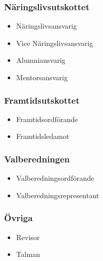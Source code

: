 \documentclass{dsekkallelse}
\begin{document}
\begin{multicols}{2}
  \subsubsection{Näringslivsutskottet}
    \begin{itemize}
      \item Näringslivsansvarig
      \item Vice Näringslivsansvarig
      \item Alumniansvarig
      \item Mentorsansvarig
    \end{itemize}
    \subsubsection{Framtidsutskottet}
     \begin{itemize}
         \item Framtidsordförande
         \item Framtidsledamot
     \end{itemize}
     
 \subsubsection{Valberedningen}
     \begin{itemize}
         \item Valberedningsordförande
         \item Valberedningsrepresentant
     \end{itemize}
    \subsubsection{Övriga}
     \begin{itemize}
         \item Revisor
         \item Talman
     \end{itemize}
    
\end{multicols}
\end{document}
